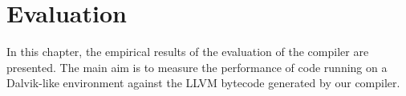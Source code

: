 \chapter{Evaluation}
\label{chap:evaluation}

In this chapter, the empirical results of the evaluation of the compiler are presented. The main aim is to measure the performance of code running on a Dalvik-like environment against the LLVM bytecode generated by our compiler.






